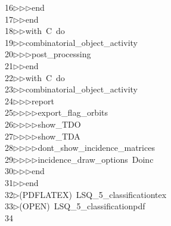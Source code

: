 \begin{tabbing}
16\>$\triangleright$\>$\triangleright$\>$\triangleright$\>end\ \\[0pt]
17\>$\triangleright$\>$\triangleright$\>end\ \\[0pt]
18\>$\triangleright$\>$\triangleright$\>with\ C\ do\ \\[0pt]
19\>$\triangleright$\>$\triangleright$\>combinatorial\_object\_activity\ \\[0pt]
20\>$\triangleright$\>$\triangleright$\>$\triangleright$\>post\_processing\ \\[0pt]
21\>$\triangleright$\>$\triangleright$\>end\ \\[0pt]
22\>$\triangleright$\>$\triangleright$\>with\ C\ do\ \\[0pt]
23\>$\triangleright$\>$\triangleright$\>combinatorial\_object\_activity\ \\[0pt]
24\>$\triangleright$\>$\triangleright$\>$\triangleright$\>report\ \\[0pt]
25\>$\triangleright$\>$\triangleright$\>$\triangleright$\>$\triangleright$\>export\_flag\_orbits\ \\[0pt]
26\>$\triangleright$\>$\triangleright$\>$\triangleright$\>$\triangleright$\>show\_TDO\ \\[0pt]
27\>$\triangleright$\>$\triangleright$\>$\triangleright$\>$\triangleright$\>show\_TDA\ \\[0pt]
28\>$\triangleright$\>$\triangleright$\>$\triangleright$\>$\triangleright$\>dont\_show\_incidence\_matrices\ \\[0pt]
29\>$\triangleright$\>$\triangleright$\>$\triangleright$\>$\triangleright$\>incidence\_draw\_options\ Doinc\ \\[0pt]
30\>$\triangleright$\>$\triangleright$\>$\triangleright$\>end\ \\[0pt]
31\>$\triangleright$\>$\triangleright$\>end\\[0pt]
32\>$\triangleright$\>(PDFLATEX)\ LSQ\_5\_classificationtex\\[0pt]
33\>$\triangleright$\>(OPEN)\ LSQ\_5\_classificationpdf\\[0pt]
34\>\end{tabbing}
